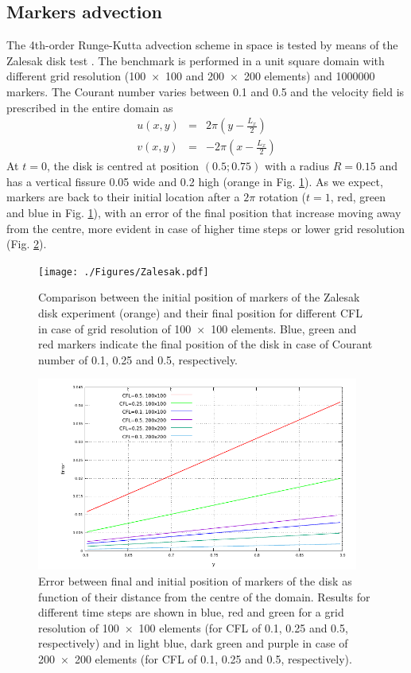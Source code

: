 \documentclass[hidelinks,10pt,a4paper]{article}
\begin{document}
\subsection{Markers advection}\label{sec:runge}
The 4th-order Runge-Kutta advection scheme in space is tested by means of the Zalesak disk test \citep{Zalesak1979,Thieulot2014}. The benchmark is performed
in a unit square domain with different grid resolution (\num{100x100} and \num{200x200} elements) and 1000000 markers. The Courant number varies between 0.1
and 0.5 and the velocity field is prescribed in the entire domain as
\begin{eqnarray}
u(x,y)&=&2\pi\left(y-\frac{L_x}{2}\right)\nonumber \\
v(x,y)&=&-2\pi\left(x-\frac{L_x}{2}\right)\nonumber
\end{eqnarray}
At $t=0$, the disk is centred at position $(0.5;0.75)$ with a radius $R=0.15$ and has a vertical fissure 0.05 wide and 0.2 high (orange in Fig. \ref{fig:runge}).
As we expect, markers are back to their initial location after a $2\pi$ rotation ($t=1$, red, green and blue in Fig. \ref{fig:runge}), with an error of the
final position that increase moving away from the centre, more evident in case of higher time steps or lower grid resolution (Fig. \ref{fig:runge_err}).

\begin{figure}
\centering
\noindent\texttt{[image: ./Figures/Zalesak.pdf]}
\caption{Comparison between the initial position of markers of the Zalesak disk experiment (orange) and their final position for different CFL in case of grid
resolution of \num{100x100} elements. Blue, green and red markers indicate the final position of the disk in case of Courant number of 0.1, 0.25 and 0.5,
respectively.}
\label{fig:runge}
\end{figure}

\begin{figure}
\centering
\noindent\includegraphics[width=400px]{./Figures/zal_error.pdf}
\caption{Error between final and initial position of markers of the disk as function of their distance from the centre of the domain. Results for different
time steps are shown in blue, red and green for a grid resolution of \num{100x100} elements (for CFL of 0.1, 0.25 and 0.5, respectively) and in light blue,
dark green and purple in case of \num{200x200} elements (for CFL of 0.1, 0.25 and 0.5, respectively).}
\label{fig:runge_err}
\end{figure}
\end{document}
